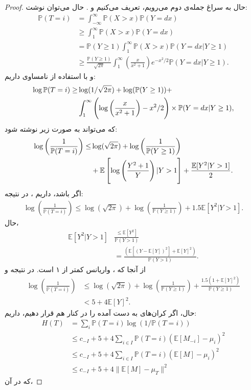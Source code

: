 \documentclass[a4paper,12pt]{article}
\newcommand{\E}{\mathbb{E}}
\newcommand{\Prob}{\mathbb{P}}
\newcommand{\Nd}{\mathcal{N}}
\begin{document}
\begin{proof}
		حال به سراغ جمله‌ی دوم می‌رویم، تعریف می‌کنیم
		\lr{$X = \phi_i-\mu_i\sim\Nd(0,1)$}
		و
		.
		حال می‌توان نوشت:
		\begin{align}
		\Prob(T=i)&=\int_{-\infty}^{\infty} \Prob(X > x) \Prob(Y=dx) \\
		&\geq\int_{1}^{\infty} \Prob(X > x) \Prob(Y=dx) \\
		&=\Prob(Y\geq 1) \int_{1}^{\infty} \Prob(X > x) \Prob(Y=dx| Y\geq 1)\\
		&\geq \frac{\Prob(Y\geq 1)}{\sqrt{2\pi}}\int_{1}^{\infty} \left(\frac{x}{x^2+1}  \right) e^{-x^2 /2}  \Prob(Y=dx | Y\geq 1).
		\end{align}
		و با استفاده از نامساوی 
		داریم:
		\begin{align}
		\log \Prob(T=i)  \geq& \log(1/\sqrt{2\pi}) + \log(\Prob(Y\geq 1)) +\notag\\
		&\int_{1}^{\infty} \left( \log \left(\frac{x}{x^2+1}\right) -x^2 /2 \right) \times  \Prob(Y=dx | Y\geq 1),
		\end{align}
		که می‌تواند به صورت زیر نوشته شود:
		\begin{align}
		\log\left(\frac{1}{\Prob(T=i)} \right) \leq&\log(\sqrt{2\pi})+ \log\left(\frac{1}{\Prob(Y\geq 1)} \right)\notag\\
		&+ \E\left[ \log\left( \frac{Y^2+1}{Y} \right) | Y>1 \right]+ \frac{\E[Y^2 |Y>1 ]}{2}.
		\end{align}
		اگر
		باشد، داریم
		،
		در نتیجه:
		\begin{align}
		\log\left(\frac{1}{\Prob(T=i)} \right) \leq \log(\sqrt{2\pi}) +\log\left(\frac{1}{\Prob(Y\geq 1)}\right)+ 1.5 \E[Y^2 |Y>1 ].
		\end{align}
		حال،
		\begin{align}
		\E[Y^2 |Y>1 ] &\frac{\leq \E[Y^2]}{\Prob(Y>1)} \\
		&= \frac{\left(\E[(Y- \E[Y])^2] + \E[Y]^2\right)}{\Prob(Y>1)}.
		\end{align}
		از آنجا که
		،
		واریانس 
		کمتر از ۱ است. در نتیجه
		\lr{$\Prob(Y>1) \geq 1-1/\sqrt{e}$}
		و
		\begin{align}
		\log\left(\frac{1}{\Prob(T=i)} \right) &\leq \log(\sqrt{2\pi})+ \log\left(\frac{1}{\Prob(Y\geq 1)}\right)+\frac{1.5(1+ \E[Y]^2)}{\Prob(Y \geq 1)} \\  
		&< 5 + 4\E[Y]^2 .
		\end{align}
		حال، اگر کران‌های به دست آمده را در کنار هم قرار دهیم، داریم:
		\begin{align}
		H(T)&= \sum_{i}\Prob(T=i)\log(1/\Prob(T=i))\\
		&\leq c_{-I}+ 5 + 4\sum_{i\in I}\Prob(T=i) (\E[M_{-i}] - \mu_i)^2 \\
		&\leq c_{-I} + 5 +4\sum_{i \in I}\Prob(T=i) (\E[M] - \mu_i)^2 \\
		&\leq c_{-I} + 5 + 4 \|  \E[M] - \mu_T \|^2
		\end{align}
		که در آن،
		\lr{$\| X\| \equiv \sqrt{\E[X^2]}$}
		

\end{proof}
\end{document}
